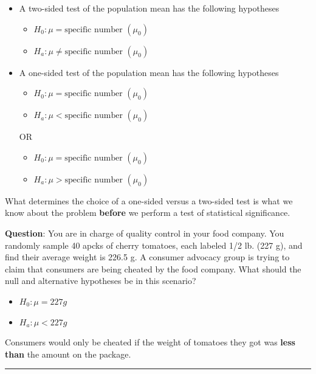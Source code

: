\documentclass[
  openany]{book}
\providecommand{\tightlist}{%
  \setlength{\itemsep}{0pt}\setlength{\parskip}{0pt}}
\begin{document}
\begin{itemize}
\item
  A two-sided test of the population mean has the following hypotheses

  \begin{itemize}
  \tightlist
  \item
    \(H_0: \mu=\text{specific number } (\mu_0)\)
  \item
    \(H_a: \mu \ne \text{specific number } (\mu_0)\)
  \end{itemize}
\item
  A one-sided test of the population mean has the following hypotheses

  \begin{itemize}
  \tightlist
  \item
    \(H_0: \mu=\text{specific number } (\mu_0)\)
  \item
    \(H_a: \mu < \text{specific number } (\mu_0)\)
  \end{itemize}

  OR

  \begin{itemize}
  \tightlist
  \item
    \(H_0: \mu = \text{specific number } (\mu_0)\)
  \item
    \(H_a: \mu > \text{specific number } (\mu_0)\)
  \end{itemize}
\end{itemize}

What determines the choice of a one-sided versus a two-sided test is what we know about the problem \textbf{before} we perform a test of statistical significance.

\textbf{Question}: You are in charge of quality control in your food company. You randomly sample 40 apcks of cherry tomatoes, each labeled 1/2 lb. (227 g), and find their average weight is 226.5 g. A consumer advocacy group is trying to claim that consumers are being cheated by the food company. What should the null and alternative hypotheses be in this scenario?

\begin{itemize}
\tightlist
\item
  \(H_0: \mu=227g\)
\item
  \(H_a: \mu<227g\)
\end{itemize}

Consumers would only be cheated if the weight of tomatoes they got was \textbf{less than} the amount on the package.

\begin{center}\rule{0.5\linewidth}{0.5pt}\end{center}
\end{document}
